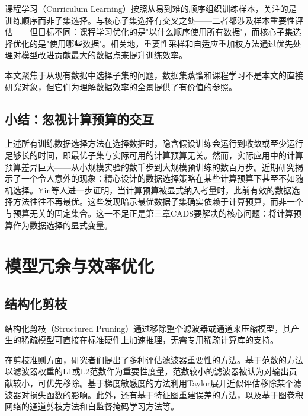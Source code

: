 课程学习（Curriculum Learning）\cite{bengio2009curriculum}按照从易到难的顺序组织训练样本，关注的是训练顺序而非子集选择\cite{hacohen2019power, soviany2021curriculum}。与核心子集选择有交叉之处——二者都涉及样本重要性评估——但目标不同：课程学习优化的是"以什么顺序使用所有数据"，而核心子集选择优化的是"使用哪些数据"。相关地，重要性采样\cite{alain2015variance, katharopoulos2018not, loshchilov2015online}和自适应重加权方法通过优先处理对模型改进贡献最大的数据点来提升训练效率。

本文聚焦于从现有数据中选择子集的问题，数据集蒸馏和课程学习不是本文的直接研究对象，但它们为理解数据效率的全景提供了有价值的参照。

\subsection{小结：忽视计算预算的交互}

上述所有训练数据选择方法在选择数据时，隐含假设训练会运行到收敛或至少运行足够长的时间，即最优子集与实际可用的计算预算无关。然而，实际应用中的计算预算差异巨大——从小规模实验的数千步到大规模预训练的数百万步。近期研究\cite{diddee2024chasing, shen2024rethinking, xia2024rethinking}揭示了一个令人意外的现象：精心设计的数据选择策略在某些计算预算下甚至不如随机选择。Yin等人\cite{yin2024compute}进一步证明，当计算预算被显式纳入考量时，此前有效的数据选择方法往往不再最优。这些发现暗示最优数据子集确实依赖于计算预算，而非一个与预算无关的固定集合。这一不足正是第三章CADS要解决的核心问题：将计算预算作为数据选择的显式变量。


\section{模型冗余与效率优化}\label{sec:model-redundancy}

\subsection{结构化剪枝}

结构化剪枝（Structured Pruning）通过移除整个滤波器或通道来压缩模型\cite{he2018soft, jiang2022channel}，其产生的稀疏模型可直接在标准硬件上加速推理，无需专用稀疏计算库的支持。

在剪枝准则方面，研究者们提出了多种评估滤波器重要性的方法。基于范数的方法\cite{han2015learning}以滤波器权重的L1或L2范数作为重要性度量，范数较小的滤波器被认为对输出贡献较小，可优先移除。基于梯度敏感度的方法利用Taylor展开近似评估移除某个滤波器对损失函数的影响\cite{lecun1989optimal, hassibi1992second}。此外，还有基于特征图重建误差的方法\cite{he2018soft}，以及基于图卷积网络的通道剪枝方法\cite{jiang2022channel}和自监督掩码学习方法\cite{elkerdawy2022fire}等。

